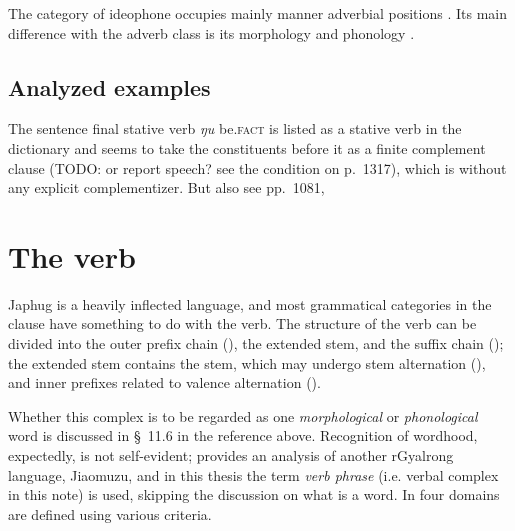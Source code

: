 \documentclass[a4paper, oneside, 12pt]{report}
\newcommand*{\citesec}[1]{\S~{#1}}
\newcommand*{\citechap}[1]{Ch~{#1}}
\newcommand*{\citetable}[1]{Table~{#1}}
\newcommand*{\citepage}[1]{p.~{#1}}
\newcommand*{\citepages}[1]{pp.~{#1}}
\newcommand*{\term}[1]{\emph{#1}}
\newcommand{\form}[1]{\emph{#1}}
\newcommand{\category}[1]{\textsc{#1}}
\begin{document}
The category of ideophone occupies mainly manner adverbial positions
\citep[\citesec{10.1.7}]{jacques2021grammar}.
Its main difference with the adverb class 
is its morphology \citep[\citesec{10.1.2}]{jacques2021grammar}
and phonology \citep[\citesec{10.1.5}]{jacques2021grammar}.

\section{Analyzed examples}


The sentence final stative verb \form{ŋu} be.\category{fact} is 
listed as a stative verb in the dictionary
and seems to take the constituents before it 
as a finite complement clause (TODO: or report speech? see the condition on \citepage{1317}),
which is without any explicit complementizer. 
But also see \citepages{1081, }

\chapter{The verb}

Japhug is a heavily inflected language, 
and most grammatical categories in the clause 
have something to do with the verb.
The structure of the verb can be divided into 
the outer prefix chain (\citealt[\citetable{11.1}]{jacques2021grammar}),
the extended stem, 
and the suffix chain (\citealt[\citesec{11.3}]{jacques2021grammar});
the extended stem contains the stem, 
which may undergo stem alternation (\citealt[\citechap{12}]{jacques2021grammar}),
and inner prefixes related to valence alternation
(\citealt[\citesec{11.2.2}]{jacques2021grammar}).

Whether this complex is to be regarded as one \emph{morphological} or \emph{phonological} word 
is discussed in \citesec{11.6}
in the reference above.
Recognition of wordhood, expectedly, is not self-evident;
\citet{prins2011web} provides an analysis of another rGyalrong language, Jiaomuzu, 
and in this thesis the term \term{verb phrase} 
(i.e. verbal complex in this note) is used,
skipping the discussion on what is a word.
In \citet[\citetable{11.3}]{jacques2021grammar}
four domains are defined using various criteria.
\end{document}
